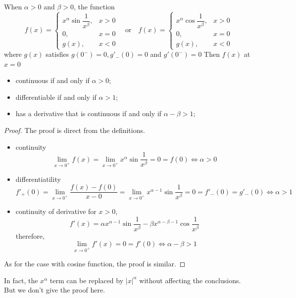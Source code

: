 \documentclass{overview}
\begin{document}
\begin{theorem}
	When $\alpha > 0$ and $\beta > 0$, the function
	\[
	f(x) = \begin{cases}
		x^{\alpha}\sin\dfrac{1}{x^{\beta}}, & x >0\\
		0, & x = 0 \\
		g(x), & x < 0
	\end{cases}
	\quad \text{or} \quad
	f(x) = \begin{cases}
		x^{\alpha}\cos\dfrac{1}{x^{\beta}}, & x >0\\
		0, & x = 0 \\
		g(x), & x < 0
	\end{cases}
	\] 
	where $g(x)$ satisfies $g(0^-) = 0, g'_-(0)=0$ and $g'(0^{-})=0$
	Then $f(x)$ at $x = 0$
	\begin{itemize}
		\item continuous if and only if $\alpha > 0$;
		\item differentiable if and only if $\alpha > 1$;
		\item has a derivative that is continuous if and only if
			$\alpha - \beta > 1$;
	\end{itemize}
	\begin{proof}
		The proof is direct from the definitions.
		\begin{itemize}
			\item continuity
				\[
					\lim_{x \to 0^{+}} f(x) = \lim_{x \to 0^{+}} x^{\alpha}
					\sin\frac{1}{x^{\beta}} = 0 = f(0) \iff \alpha > 0
				\] 
			\item differentiatility
				\[
					f'_+(0) = \lim_{x \to 0^{+}} \frac{f(x) - f(0)}{x - 0} =
					\lim_{x \to 0^{+}} x^{\alpha - 1} \sin\frac{1}{x^{\beta}}
					= 0 = f'_-(0) = g'_-(0) \iff \alpha > 1
				\] 
			\item continuity of derivative
				for $x > 0$,
				\[
					f'(x) = \alpha x^{\alpha - 1} \sin\frac{1}{x^{\beta}} -
					\beta x^{\alpha - \beta - 1} \cos\frac{1}{x^{\beta}}
				\] 
				therefore,
				\[
					\lim_{x \to 0^{+}} f'(x) = 0 = f'(0) \iff \alpha - \beta > 1
				\]
		\end{itemize}
		As for the case with cosine function, the proof is similar.
	\end{proof}
	\begin{remark}
		In fact, the $x^{\alpha}$ term can be replaced by $|x|^{\alpha}$ without
		affecting the conclusions. But we don't give the proof here.
	\end{remark}
\end{theorem}
\end{document}
